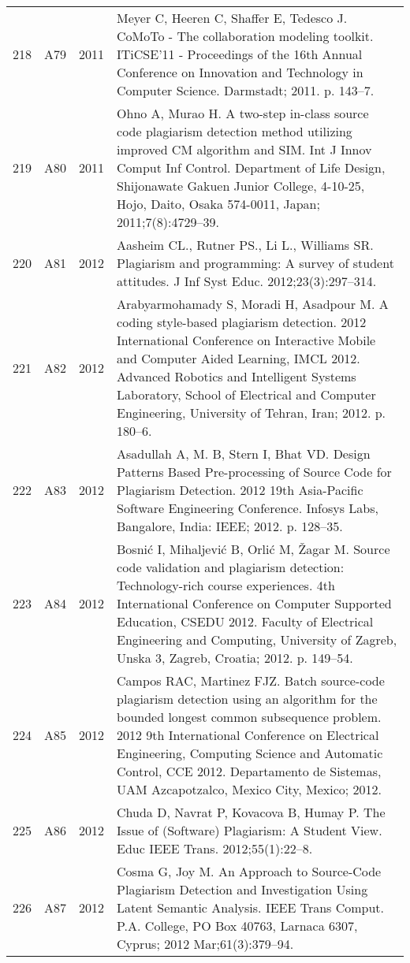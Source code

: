 \documentclass{article}\usepackage[]{graphicx}\usepackage[]{color}
\begin{document}
\begin{longtable}{l|L{1cm}|L{1cm}|L{12cm}|}
  218 & A79 & 2011 & Meyer C, Heeren C, Shaffer E, Tedesco J. CoMoTo - The collaboration modeling toolkit. ITiCSE’11 - Proceedings of the 16th Annual Conference on Innovation and Technology in Computer Science. Darmstadt; 2011. p. 143–7. \\ 
  219 & A80 & 2011 & Ohno A, Murao H. A two-step in-class source code plagiarism detection method utilizing improved CM algorithm and SIM. Int J Innov Comput Inf Control. Department of Life Design, Shijonawate Gakuen Junior College, 4-10-25, Hojo, Daito, Osaka 574-0011, Japan; 2011;7(8):4729–39. \\ 
  220 & A81 & 2012 & Aasheim CL., Rutner PS., Li L., Williams SR. Plagiarism and programming: A survey of student attitudes. J Inf Syst Educ. 2012;23(3):297–314. \\ 
  221 & A82 & 2012 & Arabyarmohamady S, Moradi H, Asadpour M. A coding style-based plagiarism detection. 2012 International Conference on Interactive Mobile and Computer Aided Learning, IMCL 2012. Advanced Robotics and Intelligent Systems Laboratory, School of Electrical and Computer Engineering, University of Tehran, Iran; 2012. p. 180–6. \\ 
  222 & A83 & 2012 & Asadullah A, M. B, Stern I, Bhat VD. Design Patterns Based Pre-processing of Source Code for Plagiarism Detection. 2012 19th Asia-Pacific Software Engineering Conference. Infosys Labs, Bangalore, India: IEEE; 2012. p. 128–35. \\ 
  223 & A84 & 2012 & Bosnić I, Mihaljević B, Orlić M, Žagar M. Source code validation and plagiarism detection: Technology-rich course experiences. 4th International Conference on Computer Supported Education, CSEDU 2012. Faculty of Electrical Engineering and Computing, University of Zagreb, Unska 3, Zagreb, Croatia; 2012. p. 149–54. \\ 
  224 & A85 & 2012 & Campos RAC, Martinez FJZ. Batch source-code plagiarism detection using an algorithm for the bounded longest common subsequence problem. 2012 9th International Conference on Electrical Engineering, Computing Science and Automatic Control, CCE 2012. Departamento de Sistemas, UAM Azcapotzalco, Mexico City, Mexico; 2012. \\ 
  225 & A86 & 2012 & Chuda D, Navrat P, Kovacova B, Humay P. The Issue of (Software) Plagiarism: A Student View. Educ IEEE Trans. 2012;55(1):22–8. \\ 
  226 & A87 & 2012 & Cosma G, Joy M. An Approach to Source-Code Plagiarism Detection and Investigation Using Latent Semantic Analysis. IEEE Trans Comput. P.A. College, PO Box 40763, Larnaca 6307, Cyprus; 2012 Mar;61(3):379–94. \\ 

\end{longtable}
\end{document}
